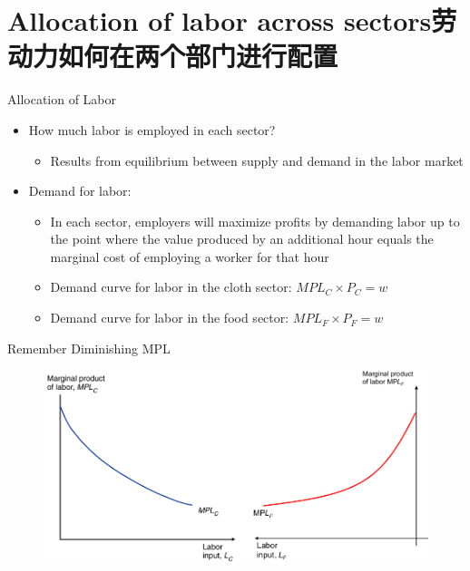 \documentclass[10pt,hyperref={CJKbookmarks=true},xcolor=dvipsnames,aspectratio=169]{beamer}
\begin{document}
\section{Allocation of labor across sectors劳动力如何在两个部门进行配置}
\begin{frame}{Allocation of Labor }

\begin{itemize}
\item How much labor is employed in each sector? 

\begin{itemize}
\item Results from equilibrium between supply and demand in the labor market 
\end{itemize}
\item Demand for labor: 

\begin{itemize}
\item In each sector, employers will maximize profits by demanding labor
up to the point where the value produced by an additional hour equals
the marginal cost of employing a worker for that hour 
\item Demand curve for labor in the cloth sector: $MPL_{C}\times P_{C}=w$ 
\item Demand curve for labor in the food sector: $MPL_{F}\times P_{F}=w$ 
\end{itemize}
\end{itemize}
\end{frame}

\begin{frame}{Remember Diminishing MPL}


\begin{figure}


\begin{centering}
\includegraphics[width=12cm]{fig/sfm/lec4-11}
\par\end{centering}

\end{figure}

\end{frame}
\end{document}
